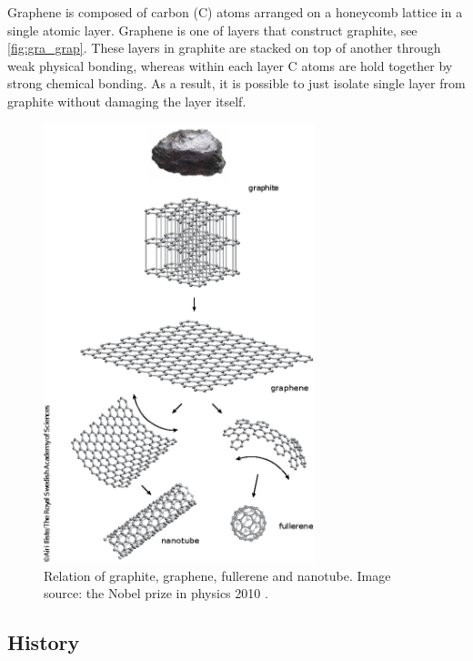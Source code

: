 Graphene is composed of carbon (C) atoms arranged on a honeycomb lattice in a single atomic layer. Graphene is one of layers that construct graphite, see \autoref{fig:gra_grap}. These layers in graphite are stacked on top of another through weak physical bonding, whereas within each layer C atoms are hold together by strong chemical bonding. As a result, it is possible to just isolate single layer from graphite without damaging the layer itself. 

\begin{figure}[htbp!] 
\centering  
\includegraphics[width=0.7\textwidth]{gra_grap.eps}
\caption{Relation of graphite, graphene, fullerene and nanotube. Image source: the Nobel prize in physics 2010 \cite{gra_grap}. }  
\label{fig:gra_grap}
\end{figure} 


\subsection{History}

